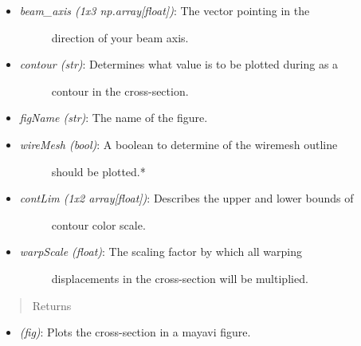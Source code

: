 \documentclass[letterpaper,10pt,english]{sphinxmanual}
\begin{document}
\begin{fulllineitems}
\begin{fulllineitems}
\begin{itemize}
\begin{description}
\end{description}

\item {} \begin{description}
\item[{\emph{beam\_axis (1x3 np.array{[}float{]})}: The vector pointing in the}] \leavevmode
direction of your beam axis.

\end{description}

\item {} \begin{description}
\item[{\emph{contour (str)}: Determines what value is to be plotted during as a}] \leavevmode
contour in the cross-section.

\end{description}

\item {} 
\emph{figName (str)}: The name of the figure.

\item {} \begin{description}
\item[{\emph{wireMesh (bool)}: A boolean to determine of the wiremesh outline}] \leavevmode
should be plotted.*

\end{description}

\item {} \begin{description}
\item[{\emph{contLim (1x2 array{[}float{]})}: Describes the upper and lower bounds of}] \leavevmode
contour color scale.

\end{description}

\item {} \begin{description}
\item[{\emph{warpScale (float)}: The scaling factor by which all warping}] \leavevmode
displacements in the cross-section will be multiplied.

\end{description}

\end{itemize}
\begin{quote}\begin{description}
\item[{Returns}] \leavevmode
\end{description}\end{quote}
\begin{itemize}
\item {} 
\emph{(fig)}: Plots the cross-section in a mayavi figure.


\end{itemize}
\end{fulllineitems}
\end{fulllineitems}
\end{document}
